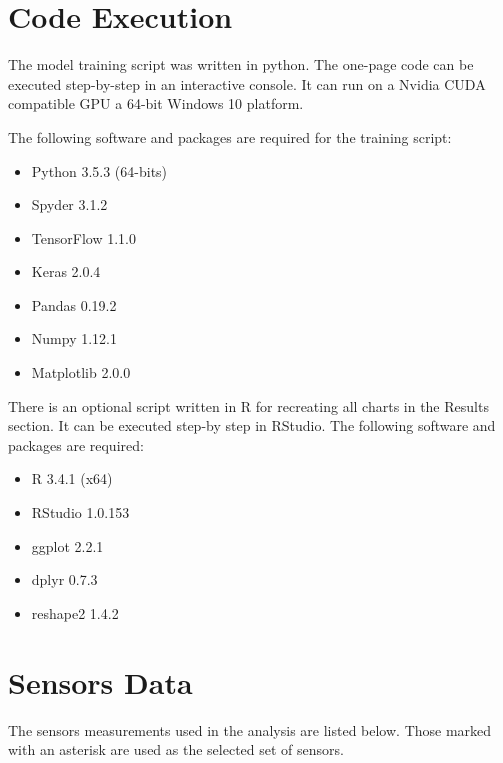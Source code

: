 \documentclass[11pt]{article} %
\theoremstyle{plain}
\theoremstyle{definition}
\begin{document}
\begin{appendices}
\newpage
\section{Code Execution}

The model training script was written in python. The one-page code can be executed step-by-step in an interactive console. It can run on a Nvidia CUDA compatible GPU a 64-bit Windows 10 platform.

The following software and packages are required for the training script:

\begin{itemize}
	\item Python 3.5.3 (64-bits)
	\item Spyder 3.1.2
	\item TensorFlow 1.1.0
	\item Keras 2.0.4
	\item Pandas 0.19.2
	\item Numpy 1.12.1
	\item Matplotlib 2.0.0
\end{itemize}

There is an optional script written in R for recreating all charts in the Results section. It can be executed step-by step in RStudio. The following software and packages are required:

\begin{itemize}
	\item R 3.4.1 (x64)
	\item RStudio 1.0.153
	\item ggplot 2.2.1
	\item dplyr 0.7.3
	\item reshape2 1.4.2
\end{itemize}


\newpage
\section{Sensors Data}

The sensors measurements used in the analysis are listed below. Those marked with an asterisk are used as the selected set of sensors.




\end{appendices}
\end{document}
